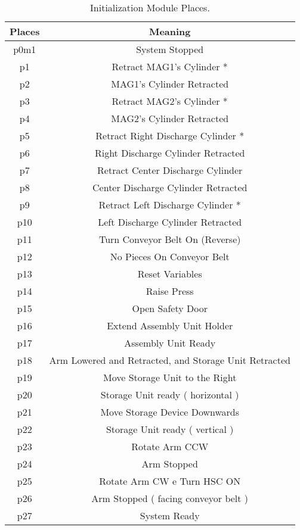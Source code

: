 \begin{table}[htbp]
\caption{Initialization Module Places.}
\centering
\begin{tabular}{cc}
Places & Meaning\\
\hline
p0m1 & System Stopped\\
p1 & Retract MAG1's Cylinder *\\
p2 & MAG1's Cylinder Retracted\\
p3 & Retract MAG2's Cylinder *\\
p4 & MAG2's Cylinder Retracted\\
p5 & Retract Right Discharge Cylinder *\\
p6 & Right Discharge Cylinder Retracted\\
p7 & Retract Center Discharge Cylinder\\
p8 & Center Discharge Cylinder Retracted\\
p9 & Retract Left Discharge Cylinder *\\
p10 & Left Discharge Cylinder Retracted\\
p11 & Turn Conveyor Belt On (Reverse)\\
p12 & No Pieces On Conveyor Belt\\
p13 & Reset Variables\footnotemark\\
p14 & Raise Press\\
p15 & Open Safety Door\\
p16 & Extend Assembly Unit Holder\\
p17 & Assembly Unit Ready\\
p18 & Arm Lowered and Retracted, and Storage Unit Retracted\\
p19 & Move Storage Unit to the Right\\
p20 & Storage Unit ready ( horizontal )\\
p21 & Move Storage Device Downwards\\
p22 & Storage Unit ready ( vertical )\\
p23 & Rotate Arm CCW\\
p24 & Arm Stopped\\
p25 & Rotate Arm CW e Turn HSC ON\\
p26 & Arm Stopped ( facing conveyor belt )\\
p27 & System Ready\\
\end{tabular}
\end{table}

